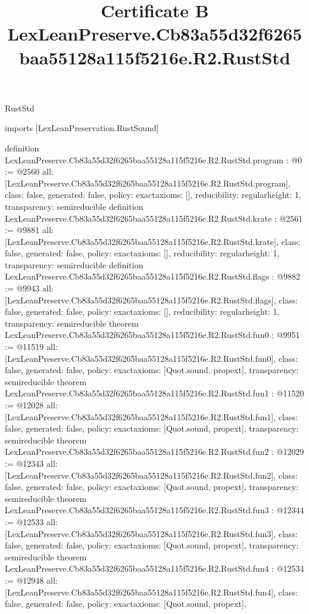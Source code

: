 \begin{lexlean}{RustStd}
\title{Certificate B LexLeanPreserve.Cb83a55d32f6265baa55128a115f5216e.R2.RustStd}
\begin{coremodule}
imports [LexLeanPreservation.RustSound]

definition LexLeanPreserve.Cb83a55d32f6265baa55128a115f5216e.R2.RustStd.program : @0 := @2560 {
  all: [LexLeanPreserve.Cb83a55d32f6265baa55128a115f5216e.R2.RustStd.program],
  class: false,
  generated: false,
  policy: exact{axioms: []},
  reducibility: regular{height: 1},
  transparency: semireducible
}
definition LexLeanPreserve.Cb83a55d32f6265baa55128a115f5216e.R2.RustStd.krate : @2561 := @9881 {
  all: [LexLeanPreserve.Cb83a55d32f6265baa55128a115f5216e.R2.RustStd.krate],
  class: false,
  generated: false,
  policy: exact{axioms: []},
  reducibility: regular{height: 1},
  transparency: semireducible
}
definition LexLeanPreserve.Cb83a55d32f6265baa55128a115f5216e.R2.RustStd.flags : @9882 := @9943 {
  all: [LexLeanPreserve.Cb83a55d32f6265baa55128a115f5216e.R2.RustStd.flags],
  class: false,
  generated: false,
  policy: exact{axioms: []},
  reducibility: regular{height: 1},
  transparency: semireducible
}
theorem LexLeanPreserve.Cb83a55d32f6265baa55128a115f5216e.R2.RustStd.fun0 : @9951 := @11519 {
  all: [LexLeanPreserve.Cb83a55d32f6265baa55128a115f5216e.R2.RustStd.fun0],
  class: false,
  generated: false,
  policy: exact{axioms: [Quot.sound, propext]},
  transparency: semireducible
}
theorem LexLeanPreserve.Cb83a55d32f6265baa55128a115f5216e.R2.RustStd.fun1 : @11520 := @12028 {
  all: [LexLeanPreserve.Cb83a55d32f6265baa55128a115f5216e.R2.RustStd.fun1],
  class: false,
  generated: false,
  policy: exact{axioms: [Quot.sound, propext]},
  transparency: semireducible
}
theorem LexLeanPreserve.Cb83a55d32f6265baa55128a115f5216e.R2.RustStd.fun2 : @12029 := @12343 {
  all: [LexLeanPreserve.Cb83a55d32f6265baa55128a115f5216e.R2.RustStd.fun2],
  class: false,
  generated: false,
  policy: exact{axioms: [Quot.sound, propext]},
  transparency: semireducible
}
theorem LexLeanPreserve.Cb83a55d32f6265baa55128a115f5216e.R2.RustStd.fun3 : @12344 := @12533 {
  all: [LexLeanPreserve.Cb83a55d32f6265baa55128a115f5216e.R2.RustStd.fun3],
  class: false,
  generated: false,
  policy: exact{axioms: [Quot.sound, propext]},
  transparency: semireducible
}
theorem LexLeanPreserve.Cb83a55d32f6265baa55128a115f5216e.R2.RustStd.fun4 : @12534 := @12948 {
  all: [LexLeanPreserve.Cb83a55d32f6265baa55128a115f5216e.R2.RustStd.fun4],
  class: false,
  generated: false,
  policy: exact{axioms: [Quot.sound, propext]},
}
\end{coremodule}
\end{lexlean}
